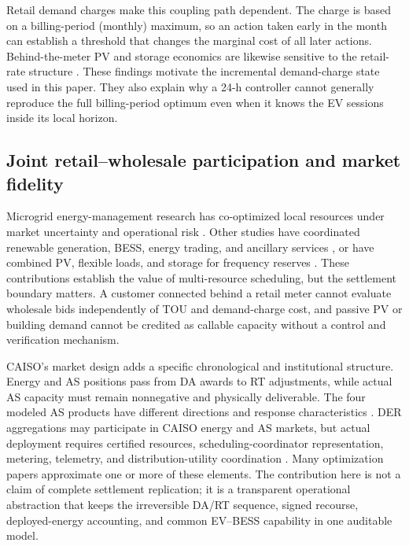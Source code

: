 \documentclass[final,5p,times]{elsarticle}
\begin{document}
Retail demand charges make this coupling path dependent. The charge is based on a billing-period (monthly) maximum, so an action taken early in the month can establish a threshold that changes the marginal cost of all later actions. Behind-the-meter PV and storage economics are likewise sensitive to the retail-rate structure \cite{boampong2020retail}. These findings motivate the incremental demand-charge state used in this paper. They also explain why a 24-h controller cannot generally reproduce the full billing-period optimum even when it knows the EV sessions inside its local horizon.

\subsection{Joint retail--wholesale participation and market fidelity}
Microgrid energy-management research has co-optimized local resources under market uncertainty and operational risk \cite{parisio2014model} \cite{shen2016microgrid} \cite{hasankhani2021stochastic}. Other studies have coordinated renewable generation, BESS, energy trading, and ancillary services \cite{santosuosso2024sempc}, or have combined PV, flexible loads, and storage for frequency reserves \cite{warmerdam2026power}. These contributions establish the value of multi-resource scheduling, but the settlement boundary matters. A customer connected behind a retail meter cannot evaluate wholesale bids independently of TOU and demand-charge cost, and passive PV or building demand cannot be credited as callable capacity without a control and verification mechanism.

CAISO's market design adds a specific chronological and institutional structure. Energy and AS positions pass from DA awards to RT adjustments, while actual AS capacity must remain nonnegative and physically deliverable. The four modeled AS products have different directions and response characteristics \cite{caisoAncillary2026}. DER aggregations may participate in CAISO energy and AS markets, but actual deployment requires certified resources, scheduling-coordinator representation, metering, telemetry, and distribution-utility coordination \cite{caisoDER2026}. Many optimization papers approximate one or more of these elements. The contribution here is not a claim of complete settlement replication; it is a transparent operational abstraction that keeps the irreversible DA/RT sequence, signed recourse, deployed-energy accounting, and common EV--BESS capability in one auditable model.
\end{document}
